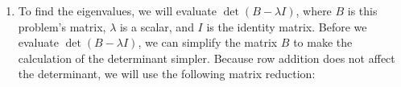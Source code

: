 \documentclass[10pt,letterpaper,final]{report}
\begin{document}
\begin{enumerate}[label=(\alph*)]
\begin{enumerate}[label=(\arabic*)]
\begin{align*}
                  \begin{bmatrix}
                    x_1 \\
                    x_2
                  \end{bmatrix} = \begin{bmatrix}
                                    0x_1 - x_2 \\
                                    0x_1 + x_2
                                  \end{bmatrix} = \begin{bmatrix}
                                                    - x_2 \\
                                                    x_2
                                                  \end{bmatrix} = x_2\begin{bmatrix}
                                                                       -1 \\
                                                                       1
                                                                     \end{bmatrix}
                \end{align*}
                Hence the basis for the eigenspace corresponding to $\lambda_2 = 2$ is $\left\{\begin{bmatrix}-1\\1\end{bmatrix}\right\}$.
                \begin{figure}[H]
                  \centering
                  \caption{{Basis for the eigenspace $E_{\lambda_i}$ corresponding to $\lambda_2 = 2$}}
                \end{figure}
        \end{enumerate}
  \item To find the eigenvalues, we will evaluate $\det (B - \lambda I)$, where $B$ is this problem's matrix, $\lambda$ is a scalar, and $I$ is the identity matrix.
        Before we evaluate $\det (B - \lambda I)$, we can simplify the matrix $B$ to make the calculation of the determinant simpler. Because row addition does not affect the determinant, we will use the following matrix reduction:
        \begin{align*}

\end{align*}
\end{enumerate}
\end{document}

